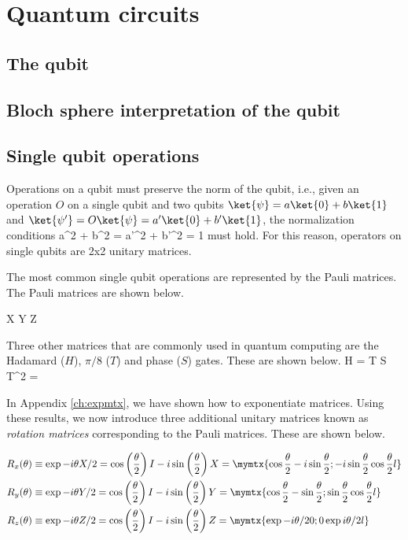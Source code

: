 \chapter{Quantum circuits\label{ch:qcirc}}

\section{The qubit}

\section{Bloch sphere interpretation of the qubit}

\section{Single qubit operations}
Operations on a qubit must preserve the norm of the qubit, i.e., given an operation $O$ on a single qubit and two qubits $\ket{\psi} = a\ket{0} + b\ket{1}$ and $\ket{\psi'} = O\ket{\psi} = a'\ket{0} + b'\ket{1}$, the normalization conditions
\beq
a^2 + b^2 = a'^2 + b'^2 = 1
\eeq
must hold. For this reason, operators on single qubits are 2x2 unitary matrices. 

The most common single qubit operations are represented by the Pauli matrices.  The Pauli matrices are shown below. 

\beq
X \equiv {} \text{ ; } Y \equiv {} \text{ ; } Z \equiv {}
\eeq

Three other matrices that are commonly used in quantum computing are the Hadamard ($H$), $\pi/8$ ($T$) and phase ($S$) gates. These are shown below.
\beq
H \equiv {} =  \text{ ; } T \equiv {} \text{ ; } S \equiv T^2 = 
\eeq

In Appendix \ref{ch:expmtx}, we have shown how to exponentiate matrices. Using these results, we now introduce three additional unitary matrices known as \textit{rotation matrices} corresponding to the Pauli matrices. These are shown below.

\begin{align}
R_x(\theta) &\equiv \exp{-i\theta X/2} = \cos\left(\frac{\theta}{2}\right)I - i\sin\left(\frac{\theta}{2}\right)X = 
\mymtx{\cos\frac{\theta}{2} -i\sin\frac{\theta}{2} ; -i\sin\frac{\theta}{2} \cos\frac{\theta}{2}l}\\ 
R_y(\theta) &\equiv \exp{-i\theta Y/2} = \cos\left(\frac{\theta}{2}\right)I - i\sin\left(\frac{\theta}{2}\right)Y = 
\mymtx{\cos\frac{\theta}{2} -\sin\frac{\theta}{2} ; \sin\frac{\theta}{2} \cos\frac{\theta}{2}l}\\ 
R_z(\theta) &\equiv \exp{-i\theta Z/2} = \cos\left(\frac{\theta}{2}\right)I - i\sin\left(\frac{\theta}{2}\right)Z = 
\mymtx{\exp{-i\theta/2} 0 ; 0 \exp{i\theta/2}l}
\end{align}

